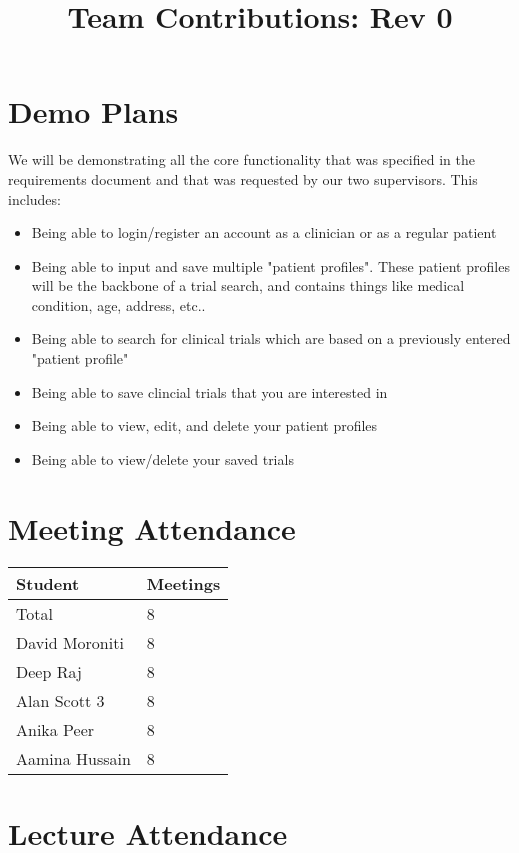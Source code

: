 \documentclass{article}
\title{Team Contributions: Rev 0\\\progname}
\author{\authname}
\date{}
\begin{document}
\maketitle

\section{Demo Plans}
 
We will be demonstrating all the core functionality that was specified in the requirements document and that was requested by our 
two supervisors. This includes:\\
\begin{itemize}
    \item Being able to login/register an account as a clinician or as a regular patient
    \item Being able to input and save multiple "patient profiles". These patient profiles will be the backbone of a trial search, and 
    contains things like medical condition, age, address, etc..
    \item Being able to search for clinical trials which are based on a previously entered "patient profile"
    \item Being able to save clincial trials that you are interested in
    \item Being able to view, edit, and delete your patient profiles
    \item Being able to view/delete your saved trials
\end{itemize}

\section{Meeting Attendance}

\begin{table}[H]
\centering
\begin{tabular}{ll}
\toprule
\textbf{Student} & \textbf{Meetings}\\
\midrule
Total & 8\\
David Moroniti & 8\\
Deep Raj & 8\\
Alan Scott 3 & 8\\
Anika Peer & 8\\
Aamina Hussain & 8\\
\bottomrule
\end{tabular}
\end{table}

\section{Lecture Attendance}
\end{document}
